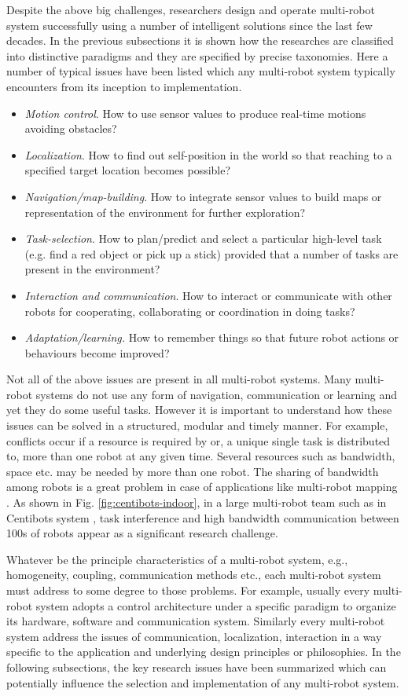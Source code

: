 Despite the above big challenges, researchers design and operate multi-robot system successfully using a number of intelligent solutions since the last few decades. In the previous subsections it  is shown how the researches are classified into distinctive paradigms and they are specified by precise taxonomies. Here a number of typical issues have been listed which any multi-robot system typically encounters from its inception to implementation.
\begin{itemize}
\item {\em Motion control}. How to use sensor values to produce real-time motions avoiding obstacles?
\item {\em Localization}. How to find out self-position in the world so that reaching to a specified target location becomes possible?
\item {\em Navigation/map-building}. How to integrate sensor values to build maps or representation of the environment for further exploration?
\item {\em Task-selection}. How to plan/predict and select a particular high-level task (e.g. find a red object or pick up a stick) provided that a number of tasks are present in the environment? 
\item {\em Interaction and communication}. How to interact or communicate with other robots for cooperating, collaborating or coordination in doing tasks?
\item {\em Adaptation/learning.} How to remember things so that future robot actions or behaviours become improved?
\end{itemize}
Not all of the above issues are present in all multi-robot systems. Many multi-robot systems do not use any form of navigation, communication or learning and yet they do some useful tasks. However it is important to understand how these issues can be solved in a structured, modular and timely manner. For example, conflicts occur if a resource is required by or, a unique single task is distributed to, more than one robot at any given time. Several resources such as bandwidth, space etc. may be needed by more than one robot. The sharing of bandwidth among robots is a great problem in case of applications like multi-robot mapping \cite{Konolige+2003}. As shown in Fig. \ref{fig:centibots-indoor}, in a large multi-robot team such as in Centibots system \cite{Ortiz+2005}, task interference and high bandwidth communication between 100s of robots appear as a significant research challenge.

Whatever be the principle characteristics of a multi-robot system, e.g., homogeneity, coupling, communication methods etc., each multi-robot system must address to some degree to those problems. For example, usually every multi-robot system adopts a control architecture under a specific paradigm to organize its hardware, software and communication system. Similarly every multi-robot system address the issues of communication, localization, interaction in a way specific to the application and underlying design principles or philosophies. In the following subsections,  the key research issues have been summarized which can potentially influence the selection and implementation of any multi-robot system.
